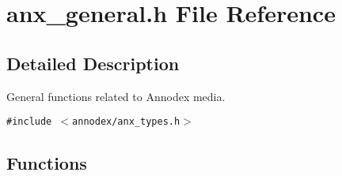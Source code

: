 \section{anx\_\-general.h File Reference}
\label{anx__general_8h}


\subsection{Detailed Description}
General functions related to Annodex media. 



{\tt \#include $<$annodex/anx\_\-types.h$>$}\par
\subsection*{Functions}
